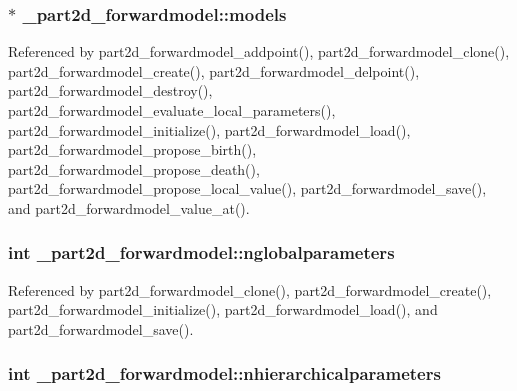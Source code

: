 \subsubsection[{\texorpdfstring{models}{models}}]{$\ast$ \+\_\+part2d\+\_\+forwardmodel\+::models}\hypertarget{struct__part2d__forwardmodel_ab43f2fdabc222d4e674bc35e86e7e9b0}{}\label{struct__part2d__forwardmodel_ab43f2fdabc222d4e674bc35e86e7e9b0}


Referenced by part2d\+\_\+forwardmodel\+\_\+addpoint(), part2d\+\_\+forwardmodel\+\_\+clone(), part2d\+\_\+forwardmodel\+\_\+create(), part2d\+\_\+forwardmodel\+\_\+delpoint(), part2d\+\_\+forwardmodel\+\_\+destroy(), part2d\+\_\+forwardmodel\+\_\+evaluate\+\_\+local\+\_\+parameters(), part2d\+\_\+forwardmodel\+\_\+initialize(), part2d\+\_\+forwardmodel\+\_\+load(), part2d\+\_\+forwardmodel\+\_\+propose\+\_\+birth(), part2d\+\_\+forwardmodel\+\_\+propose\+\_\+death(), part2d\+\_\+forwardmodel\+\_\+propose\+\_\+local\+\_\+value(), part2d\+\_\+forwardmodel\+\_\+save(), and part2d\+\_\+forwardmodel\+\_\+value\+\_\+at().

\subsubsection[{\texorpdfstring{nglobalparameters}{nglobalparameters}}]{\setlength{\rightskip}{0pt plus 5cm}int \+\_\+part2d\+\_\+forwardmodel\+::nglobalparameters}\hypertarget{struct__part2d__forwardmodel_a76da460c4d9df193a12e5bf0b85f6604}{}\label{struct__part2d__forwardmodel_a76da460c4d9df193a12e5bf0b85f6604}


Referenced by part2d\+\_\+forwardmodel\+\_\+clone(), part2d\+\_\+forwardmodel\+\_\+create(), part2d\+\_\+forwardmodel\+\_\+initialize(), part2d\+\_\+forwardmodel\+\_\+load(), and part2d\+\_\+forwardmodel\+\_\+save().

\subsubsection[{\texorpdfstring{nhierarchicalparameters}{nhierarchicalparameters}}]{\setlength{\rightskip}{0pt plus 5cm}int \+\_\+part2d\+\_\+forwardmodel\+::nhierarchicalparameters}\hypertarget{struct__part2d__forwardmodel_acf218d2baa79617d40a7a1d655ffa422}{}\label{struct__part2d__forwardmodel_acf218d2baa79617d40a7a1d655ffa422}


